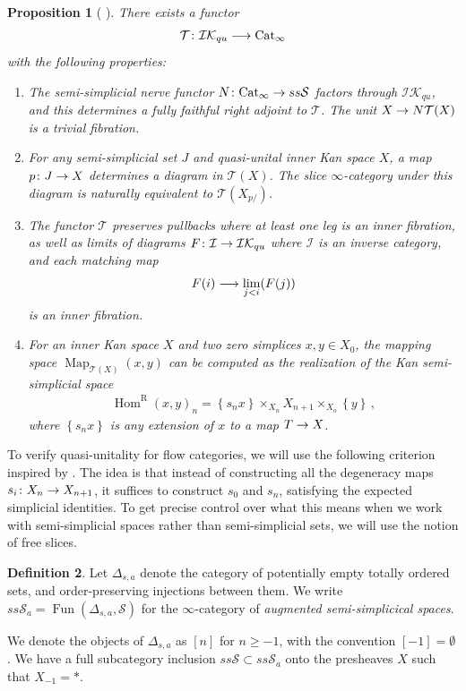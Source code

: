 \documentclass[10pt]{amsart}
\numberwithin{equation}{section}
\newtheorem{prop}{Proposition}[subsection]
\theoremstyle{definition}
\newtheorem{definition}[prop]{Definition}
\DeclareMathOperator{\Hom}{Hom}
\DeclareMathOperator{\Map}{Map}
\DeclareMathOperator{\Fun}{Fun}
\newcommand{\rR}{\mathrm{R}}
\newcommand{\Cat}{\mathrm{Cat}\vphantom{t}}
\newcommand{\Simp}{\mathbb{\Delta}}
\newcommand{\cI}{\mathcal{I}}
\newcommand{\cS}{\mathcal{S}}
\newcommand{\cT}{\mathcal{T}}
\newcommand{\IK}{\mathcal{IK}}
\renewcommand{\to}{\mathchoice{\longrightarrow}{\rightarrow}{}{}}
\begin{document}
	\begin{prop}[{\cite*[Theorem 1.3, Corollary 5.20]{oldervoll2026quasi}  }]\label{prop:semi-simplicial_results}
		There exists a functor
		\begin{align*}
			\cT\colon \IK_{qu} \to  \Cat_{\infty}
		\end{align*}
		with the following properties:
		\begin{enumerate}
			\item The semi-simplicial nerve functor $N\colon \Cat_{\infty} \to ss\cS$ factors through $\IK_{qu}$, and this determines a fully faithful right adjoint to $\cT$.
      The unit $X \to N\cT(X)$ is a trivial fibration.
			\item For any semi-simplicial set $J$ and quasi-unital inner Kan space $X$, a map $p\colon J \to X$ determines a diagram in $\cT(X)$.
      The slice $\infty$-category under this diagram is naturally equivalent to $\cT(X_{p/})$.
			\item The functor $\cT$ preserves pullbacks where at least one leg is an inner fibration, as well as limits of diagrams $F\colon \cI \to \IK_{qu}$ where $\cI$ is an inverse category, and each matching map
			\begin{align*}
				F(i) \to \lim_{j<i}(F(j))
			\end{align*}
			is an inner fibration.
			\item For an inner Kan space $X$ and two zero simplices $x,y\in X_{0}$, the mapping space $\Map_{\cT(X)}(x,y)$ can be computed as the realization of the Kan semi-simplicial space
			\begin{align*}
				\Hom^{\rR}(x,y)_{n} = \left\{ s_{n}x\right\} \times_{X_{n}} X_{n+1} \times_{X_{o}} \left\{ y\right\} \, ,
			\end{align*}
			where $\left\{ s_{n}x\right\}$ is any extension of $x$ to a map $T\to X$.
		\end{enumerate}
	\end{prop}

	To verify quasi-unitality for flow categories, we will use the following criterion inspired by \cite{AB}. The idea is that instead of constructing all the degeneracy maps $s_{i}\colon X_{n} \to X_{n+1}$, it suffices to construct $s_{0}$ and $s_{n}$, satisfying the expected simplicial identities.
  To get precise control over what this means when we work with semi-simplicial spaces rather than semi-simplicial sets, we will use the notion of free slices.

	\begin{definition}\label{def:augmented_semi-simplicial}
		Let $\Simp_{s,a}$ denote the category of potentially empty totally ordered sets, and order-preserving injections between them. We write $ss\cS_{a} = \Fun(\Simp_{s,a},\cS)$ for the $\infty$-category of \emph{augmented semi-simplicical spaces}.
	\end{definition}
	We denote the objects of $\Simp_{s,a}$ as $[n]$ for $n\geq -1$, with the convention $[-1] = \emptyset$. We have a full subcategory inclusion $ss\cS \subset ss\cS_{a}$ onto the presheaves $X$ such that $X_{-1}=\ast$.
\end{document}
